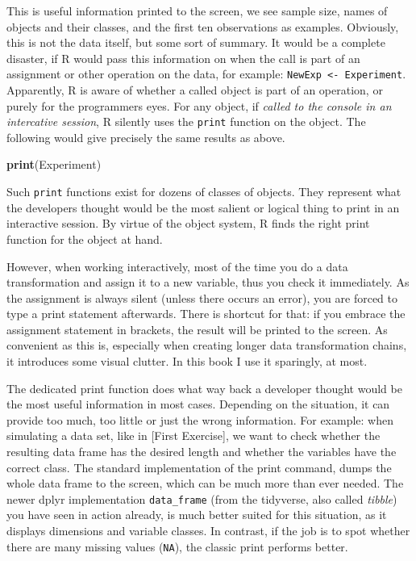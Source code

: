 \documentclass[]{svmono}
\newenvironment{Shaded}{\begin{snugshade}}{\end{snugshade}}
\newcommand{\KeywordTok}[1]{\textcolor[rgb]{0.13,0.29,0.53}{\textbf{#1}}}
\newcommand{\NormalTok}[1]{#1}
\begin{document}
This is useful information printed to the screen, we see sample size,
names of objects and their classes, and the first ten observations as
examples. Obviously, this is not the data itself, but some sort of
summary. It would be a complete disaster, if R would pass this
information on when the call is part of an assignment or other operation
on the data, for example: \texttt{NewExp\ \textless{}-\ Experiment}.
Apparently, R is aware of whether a called object is part of an
operation, or purely for the programmers eyes. For any object, if
\emph{called to the console in an intercative session}, R silently uses
the \texttt{print} function on the object. The following would give
precisely the same results as above.

\begin{Shaded}
\begin{Highlighting}[]
\KeywordTok{print}\NormalTok{(Experiment)}
\end{Highlighting}
\end{Shaded}

Such \texttt{print} functions exist for dozens of classes of objects.
They represent what the developers thought would be the most salient or
logical thing to print in an interactive session. By virtue of the
object system, R finds the right print function for the object at hand.

However, when working interactively, most of the time you do a data
transformation and assign it to a new variable, thus you check it
immediately. As the assignment is always silent (unless there occurs an
error), you are forced to type a print statement afterwards. There is
shortcut for that: if you embrace the assignment statement in brackets,
the result will be printed to the screen. As convenient as this is,
especially when creating longer data transformation chains, it
introduces some visual clutter. In this book I use it sparingly, at
most.

The dedicated print function does what way back a developer thought
would be the most useful information in most cases. Depending on the
situation, it can provide too much, too little or just the wrong
information. For example: when simulating a data set, like in {[}First
Exercise{]}, we want to check whether the resulting data frame has the
desired length and whether the variables have the correct class. The
standard implementation of the print command, dumps the whole data frame
to the screen, which can be much more than ever needed. The newer dplyr
implementation \texttt{data\_frame} (from the tidyverse, also called
\emph{tibble}) you have seen in action already, is much better suited
for this situation, as it displays dimensions and variable classes. In
contrast, if the job is to spot whether there are many missing values
(\texttt{NA}), the classic print performs better.
\end{document}
